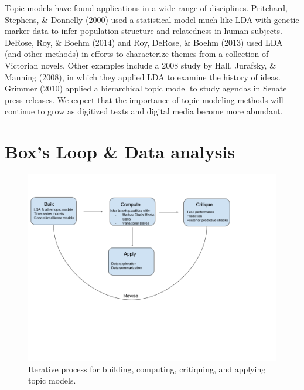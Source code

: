 \documentclass[12pt,]{article}
\begin{document}
Topic models have found applications in a wide range of disciplines.
Pritchard, Stephens, \& Donnelly (2000) used a statistical model much
like LDA with genetic marker data to infer population structure and
relatedness in human subjects. DeRose, Roy, \& Boehm (2014) and Roy,
DeRose, \& Boehm (2013) used LDA (and other methods) in efforts to
characterize themes from a collection of Victorian novels. Other
examples include a 2008 study by Hall, Jurafsky, \& Manning (2008), in
which they applied LDA to examine the history of ideas. Grimmer (2010)
applied a hierarchical topic model to study agendas in Senate press
releases. We expect that the importance of topic modeling methods will
continue to grow as digitized texts and digital media become more
abundant.

\section{Box's Loop \& Data analysis}\label{boxs-loop-data-analysis}

\begin{figure}
\includegraphics{box-blei-loop.png}
\caption{Iterative process for building, computing, critiquing, and applying topic models.\label{fig:box}}
\end{figure}
\end{document}
